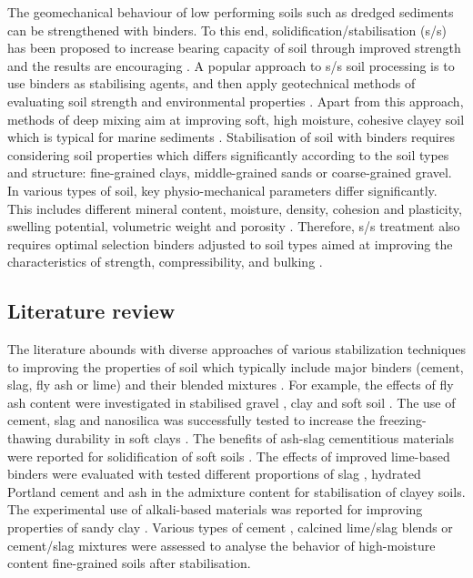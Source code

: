 \documentclass[information,article,submit,pdftex,moreauthors]{Definitions/mdpi}
\begin{document}
The geomechanical behaviour of low performing soils such as dredged sediments can be strengthened with binders. To this end, solidification/stabilisation (s/s) has been proposed to increase bearing capacity of soil through improved strength and the results are encouraging \cite{McLeod,Yongfeng,Lindh202225,Rashidi,Zhangetal2011}. A popular approach to s/s soil processing is to use binders as stabilising agents, and then apply geotechnical methods of evaluating soil strength and environmental properties \cite{Rios,ZHANG2022127996,Lindh202302}. Apart from this approach, methods of deep mixing aim at improving soft, high moisture, cohesive clayey soil which is typical for marine sediments \cite{Lindh202232,Ye}. Stabilisation of soil with binders requires considering soil properties which differs significantly according to the soil types and structure: fine-grained clays, middle-grained sands or coarse-grained gravel. In various types of soil, key physio-mechanical parameters differ significantly. This includes different mineral content, moisture, density, cohesion and plasticity, swelling potential, volumetric weight and porosity \cite{Grubb,Wangetal2018}. Therefore, s/s treatment also requires optimal selection binders adjusted to soil types aimed at improving the characteristics of strength, compressibility, and bulking \cite{Grubbetal2010}. 

\subsection{Literature review}
The literature abounds with diverse approaches of various stabilization techniques to improving the properties of soil which typically include major binders (cement, slag, fly ash or lime) and their blended mixtures \cite{Nguyen,Couvidat,Puetal2021}. For example, the effects of fly ash content were investigated in stabilised gravel \cite{Nordmark}, clay \cite{Min} and soft soil \cite{Taj}. The use of cement, slag and nanosilica was successfully tested to increase the freezing-thawing durability in soft clays \cite{Eissa}. The benefits of ash-slag cementitious materials were reported for solidification of soft soils \cite{ShuJing}. The effects of improved lime-based binders were evaluated with tested different proportions of slag \cite{Muthukkumaran}, hydrated Portland cement \cite{app11031080,Lindh202226} and ash \cite{Lietal2019} in the admixture content for stabilisation of clayey soils. The experimental use of alkali-based materials was reported for improving properties of sandy clay \cite{CORREASILVA2021106260}. Various types of cement \cite{Bazne,Lietal2016}, calcined lime/slag blends \cite{Gu} or cement/slag mixtures \cite{Lindh202222} were assessed to analyse the behavior of high-moisture content fine-grained soils after stabilisation. 
\end{document}
